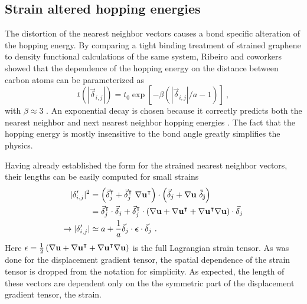 \subsection{Strain altered hopping energies}
The distortion of the nearest neighbor vectors causes a bond specific alteration of the hopping energy.
By comparing a tight binding treatment of strained graphene to density functional calculations of the same system, Ribeiro and coworkers showed that the dependence of the hopping energy on the distance between carbon atoms can be parameterized as
\begin{equation*}
  t(|\vec{\delta}_{i,j}|)=t_0 \exp[-\beta (|\vec{\delta}_{i,j}|/a-1)] \ , 
\end{equation*}
with $\beta\approx 3$ \cite{Ribeiro2009}.
An exponential decay is chosen because it correctly predicts both the nearest neighbor and next nearest neighbor hopping energies \cite{Pereira2009}.
The fact that the hopping energy is mostly insensitive to the bond angle greatly simplifies the physics.

Having already established the form for the strained nearest neighbor vectors, their lengths can be easily computed for small strains
\begin{align*}
  |\delta'_{i,j}|^2&=\left(\vec{\delta}_{j}^{\intercal}+\vec{\delta}_{j}^{\intercal} \ \bf{\nabla u}^{\intercal} \right) \cdot
    \left(\vec{\delta}_{j}+\bf{\nabla u} \ \vec{\delta}_{j} \right) \\
    &=\vec{\delta}_{j}^{\intercal} \cdot \vec{\delta}_{j}+
      \vec{\delta}_{j}^{\intercal} \cdot \left(\bf{\nabla u}+\bf{\nabla u}^{\intercal}
      +\bf{\nabla u}^{\intercal}\bf{\nabla u} \right) \cdot \vec{\delta}_{j} \\
  \rightarrow |\delta'_{i,j}|&\simeq a+\frac{1}{a} \vec{\delta}_{j} \cdot \bm{\epsilon} \cdot \vec{\delta}_{j} \ .
\end{align*}
Here $\epsilon=\frac{1}{2} \left(\bf{\nabla u}+\bf{\nabla u}^{\intercal}+\bf{\nabla u}^{\intercal}\bf{\nabla u} \right)$ is the full Lagrangian strain tensor.
As was done for the displacement gradient tensor, the spatial dependence of the strain tensor is dropped from the notation for simplicity.
As expected, the length of these vectors are dependent only on the the symmetric part of the displacement gradient tensor, the strain.

